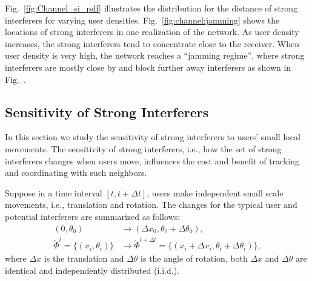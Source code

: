 \documentclass[10pt, conference, letterpaper]{IEEEtran}
\begin{document}
Fig.~\ref{fig:Channel_si_pdf} illustrates the distribution for the distance of strong interferers for varying user densities. 
Fig.~\ref{fig:channel:jamming} shows the locations of strong interferers in one realization of the network.
As user density increases, the strong interferers tend to concentrate close to the receiver. When user density is very high, the network reaches a ``jamming regime'', where strong interferers are mostly close by and block further away interferers as shown in Fig.~.



\subsection{Sensitivity of Strong Interferers}\label{section:channel:sensitivity}
In this section we study the sensitivity of strong interferers to users' small local movements.
The sensitivity of strong interferers, i.e., how the set of strong interferers changes when users move, influences the cost and benefit of tracking and coordinating with such neighbors.
 
Suppose in a time interval $[t, t+ \Delta t]$, users make independent small scale movements, i.e., translation and rotation. 
The changes for the typical user and potential interferers are summarized as follows:
\begin{equation*}
\begin{split}
(0,\theta_0)&\rightarrow(\Delta x_0, \theta_0 + \Delta\theta_0), \\
\tilde{\Phi}^{t}=\{(x_i, \theta_i)\}&\rightarrow\tilde{\Phi}^{t+\Delta t}=\{(x_i+\Delta x_i, \theta_i + \Delta\theta_i)\},
\end{split}
\end{equation*}
where $\Delta x$ is the translation and $\Delta \theta$ is the angle of rotation, both $\Delta x$ and $\Delta\theta$ are identical and independently distributed (i.i.d.).
\end{document}
